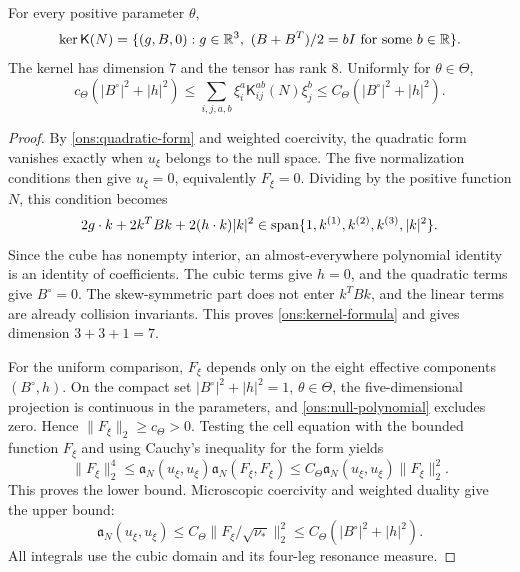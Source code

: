 \begin{theorem}\label{ons:kernel}
 For every positive parameter $\theta$,
 \begin{equation}\label{ons:kernel-formula}
 \operatorname{ker}\mathsf K(N)
 =\{(g,B,0):g\in\mathbb R^3,\ (B+B^T)/2=bI\text{ for some }b\in\mathbb R\}.
 \end{equation}
 The kernel has dimension $7$ and the tensor has rank $8$.
 Uniformly for $\theta\in\Theta$,
 \begin{equation}\label{ons:deviatoric-bound}
 c_\Theta(|B^\circ|^2+|h|^2)
 \le\sum_{i,j,a,b}\xi_i^a\mathsf K_{ij}^{ab}(N)\xi_j^b
 \le C_\Theta(|B^\circ|^2+|h|^2).
 \end{equation}
\end{theorem}
\begin{proof}
 By \eqref{ons:quadratic-form} and weighted coercivity, the quadratic
 form vanishes exactly when $u_\xi$ belongs to the null space.
 The five normalization conditions then give $u_\xi=0$, equivalently
 $F_\xi=0$. Dividing by the positive function $N$, this condition becomes
 \begin{equation}\label{ons:null-polynomial}
 2g\cdot k+2k^TBk+2(h\cdot k)|k|^2
       \in\operatorname{span}\{1,k^{(1)},k^{(2)},k^{(3)},|k|^2\}.
 \end{equation}
 Since the cube has nonempty interior, an almost-everywhere polynomial
 identity is an identity of coefficients. The cubic terms give $h=0$,
 and the quadratic terms give $B^\circ=0$. The skew-symmetric part
 does not enter $k^TBk$, and the linear terms are already collision
 invariants. This proves \eqref{ons:kernel-formula} and gives
 dimension $3+3+1=7$.

 For the uniform comparison, $F_\xi$ depends only on the eight effective
 components $(B^\circ,h)$. On the compact set
 $|B^\circ|^2+|h|^2=1$, $\theta\in\Theta$, the five-dimensional projection
 is continuous in the parameters, and \eqref{ons:null-polynomial}
 excludes zero. Hence $\|F_\xi\|_2\ge c_\Theta>0$.
 Testing the cell equation with the bounded function $F_\xi$ and using
 Cauchy's inequality for the form yields
 \[
 \|F_\xi\|_2^4
 \le\mathfrak a_N(u_\xi,u_\xi)\mathfrak a_N(F_\xi,F_\xi)
 \le C_\Theta\mathfrak a_N(u_\xi,u_\xi)\|F_\xi\|_2^2.
 \]
 This proves the lower bound. Microscopic coercivity and weighted duality
 give the upper bound:
 \[
 \mathfrak a_N(u_\xi,u_\xi)
 \le C_\Theta\|F_\xi/\sqrt{\nu_*}\|_2^2
 \le C_\Theta(|B^\circ|^2+|h|^2).
 \]
 All integrals use the cubic domain and its four-leg resonance measure.
\end{proof}

